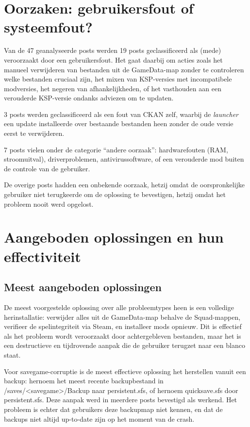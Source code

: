 \section{Oorzaken: gebruikersfout of systeemfout?}

Van de 47 geanalyseerde posts werden 19 posts geclassificeerd als (mede) veroorzaakt door een gebruikersfout. Het gaat daarbij om acties zoals het manueel verwijderen van bestanden uit de GameData-map zonder te controleren welke bestanden cruciaal zijn, het mixen van KSP-versies met incompatibele modversies, het negeren van afhankelijkheden, of het vasthouden aan een verouderde KSP-versie ondanks adviezen om te updaten.

3 posts werden geclassificeerd als een fout van CKAN zelf, waarbij de \textit{launcher} een update installeerde over bestaande bestanden heen zonder de oude versie eerst te verwijderen.

7 posts vielen onder de categorie ``andere oorzaak'': hardwarefouten (RAM, stroomuitval), driverproblemen, antivirussoftware, of een verouderde mod buiten de controle van de gebruiker.

De overige posts hadden een onbekende oorzaak, hetzij omdat de oorspronkelijke gebruiker niet terugkeerde om de oplossing te bevestigen, hetzij omdat het probleem nooit werd opgelost.

\section{Aangeboden oplossingen en hun effectiviteit}

\subsection{Meest aangeboden oplossingen}

De meest voorgestelde oplossing over alle probleemtypes heen is een volledige herinstallatie: verwijder alles uit de GameData-map behalve de Squad-mappen, verifieer de spelintegriteit via Steam, en installeer mods opnieuw. Dit is effectief als het probleem wordt veroorzaakt door achtergebleven bestanden, maar het is een destructieve en tijdrovende aanpak die de gebruiker terugzet naar een blanco staat.

Voor savegame-corruptie is de meest effectieve oplossing het herstellen vanuit een backup: hernoem het meest recente backupbestand in /saves/<savegame>/Backup naar persistent.sfs, of hernoem quicksave.sfs door persistent.sfs. Deze aanpak werd in meerdere posts bevestigd als werkend. Het probleem is echter dat gebruikers deze backupmap niet kennen, en dat de backups niet altijd up-to-date zijn op het moment van de crash.


